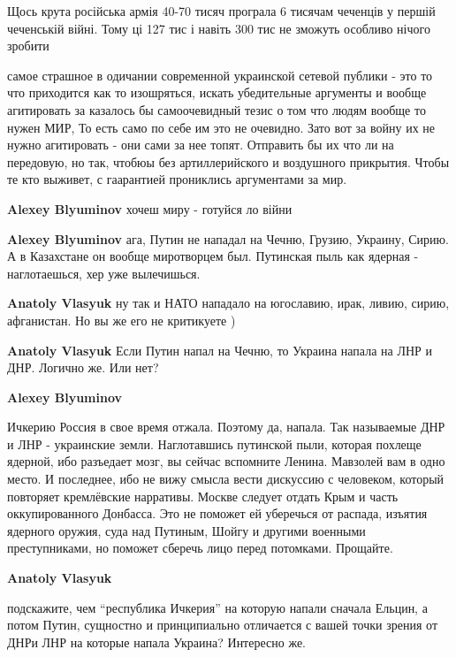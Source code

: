 \begin{itemize}
\begin{itemize}
\end{itemize} %


Щось крута російська армія 40-70 тисяч програла 6 тисячам чеченців у першій
чеченській війні. Тому ці 127 тис і навіть 300 тис не зможуть особливо нічого
зробити


самое страшное в одичании современной украинской сетевой публики - это то что
приходится как то изошряться, искать убедительные аргументы и вообще
агитировать за казалось бы самоочевидный тезис о том что людям вообще то нужен
МИР, То есть само по себе им это не очевидно. Зато вот за войну их не нужно
агитировать - они сами за нее топят. Отправить бы их что ли на передовую, но
так, чтобюы без артиллерийского и воздушного прикрытия. Чтобы те кто выживет, с
гаарантией прониклись аргументами за мир.

\begin{itemize} %
\textbf{Alexey Blyuminov} хочеш миру - готуйся ло війни

\textbf{Alexey Blyuminov} ага, Путин не нападал на Чечню, Грузию, Украину, Сирию. А в Казахстане он вообще миротворцем был. Путинская пыль как ядерная - наглотаешься, хер уже вылечишься.

\textbf{Anatoly Vlasyuk} ну так и НАТО нападало на югославию, ирак, ливию, сирию, афганистан. Но вы же его не критикуете )

\textbf{Anatoly Vlasyuk} Если Путин напал на Чечню, то Украина напала на ЛНР и ДНР. Логично же. Или нет?

\textbf{Alexey Blyuminov} 

Ичкерию Россия в свое время отжала. Поэтому да, напала. Так называемые ДНР и
ЛНР - украинские земли. Наглотавшись путинской пыли, которая похлеще ядерной,
ибо разъедает мозг, вы сейчас вспомните Ленина. Мавзолей вам в одно место. И
последнее, ибо не вижу смысла вести дискуссию с человеком, который повторяет
кремлёвские нарративы. Москве следует отдать Крым и часть оккупированного
Донбасса. Это не поможет ей уберечься от распада, изъятия ядерного оружия, суда
над Путиным, Шойгу и другими военными преступниками, но поможет сберечь лицо
перед потомками. Прощайте.

\textbf{Anatoly Vlasyuk} 

подскажите, чем \enquote{республика Ичкерия} на которую напали сначала Ельцин, а потом
Путин, сущностно и принципиально отличается с вашей точки зрения от ДНРи ЛНР на
которые напала Украина? Интересно же.


\end{itemize}
\end{itemize}
